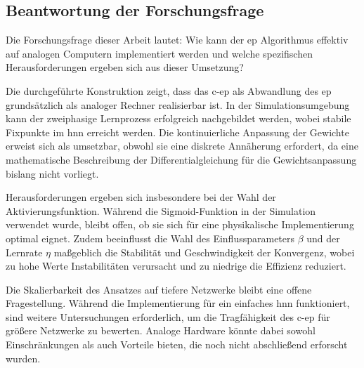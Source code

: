 \subsection{Beantwortung der Forschungsfrage}

Die Forschungsfrage dieser Arbeit lautet: Wie kann der \ac{ep} Algorithmus effektiv auf analogen Computern implementiert werden und welche spezifischen Herausforderungen ergeben sich aus dieser Umsetzung?

Die durchgeführte Konstruktion zeigt, dass das \ac{c-ep} als Abwandlung des \ac{ep} grundsätzlich als analoger Rechner realisierbar ist. In der Simulationsumgebung kann der zweiphasige Lernprozess erfolgreich nachgebildet werden, wobei stabile Fixpunkte im \ac{hnn} erreicht werden. Die kontinuierliche Anpassung der Gewichte erweist sich als umsetzbar, obwohl sie eine diskrete Annäherung erfordert, da eine mathematische Beschreibung der Differentialgleichung für die Gewichtsanpassung bislang nicht vorliegt.

Herausforderungen ergeben sich insbesondere bei der Wahl der Aktivierungsfunktion. Während die Sigmoid-Funktion in der Simulation verwendet wurde, bleibt offen, ob sie sich für eine physikalische Implementierung optimal eignet. Zudem beeinflusst die Wahl des Einflussparameters \(\beta\) und der Lernrate \(\eta\) maßgeblich die Stabilität und Geschwindigkeit der Konvergenz, wobei zu hohe Werte Instabilitäten verursacht und zu niedrige die Effizienz reduziert.

Die Skalierbarkeit des Ansatzes auf tiefere Netzwerke bleibt eine offene Fragestellung. Während die Implementierung für ein einfaches \ac{hnn} funktioniert, sind weitere Untersuchungen erforderlich, um die Tragfähigkeit des \ac{c-ep} für größere Netzwerke zu bewerten. Analoge Hardware könnte dabei sowohl Einschränkungen als auch Vorteile bieten, die noch nicht abschließend erforscht wurden.
